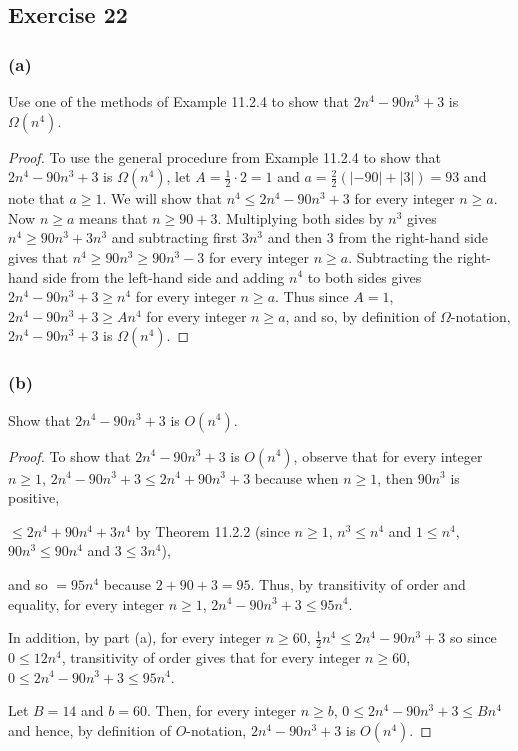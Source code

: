 \documentclass[14pt]{extarticle}
\begin{document}
\subsection{Exercise 22}
\subsubsection{(a)}
Use one of the methods of Example 11.2.4 to show that \(2n^4 - 90n^3 + 3\) is \(\Omega(n^4)\).

\begin{proof}
To use the general procedure from Example 11.2.4 to show that \(2n^4 - 90n^3 + 3\) is \(\Omega(n^4)\), let \(A = \frac{1}{2} 
\cdot 2 = 1\) and \(a = \frac{2}{2}(|-90| + |3|) = 93\) and note that \(a \geq 1\). We will show that \(n^4 \leq 2n^4 -
90n^3 + 3\) for every integer \(n \geq a\). Now \(n \geq a\) means that \(n \geq 90+3\). Multiplying both sides by \(n^3\) 
gives \(n^4 \geq 90n^3 + 3n^3\) and subtracting first \(3n^3\) and then 3 from the right-hand side gives that \(n^4 \geq 
90n^3 \geq 90n^3 - 3\) for every integer \(n \geq a\). Subtracting the right-hand side from the left-hand side and 
adding \(n^4\) to both sides gives \(2n^4 - 90n^3 + 3 \geq n^4\) for every integer \(n \geq a\). Thus since \(A = 1\), 
\(2n^4 - 90n^3 + 3 \geq An^4\) for every integer \(n \geq a\), and so, by definition of \(\Omega\)-notation, 
\(2n^4 - 90n^3 + 3\) is \(\Omega(n^4)\).
\end{proof}

\subsubsection{(b)}
Show that \(2n^4 - 90n^3 + 3\) is \(O(n^4)\).
\begin{proof}
To show that \(2n^4 - 90n^3 + 3\) is \(O(n^4)\), observe that for every integer \(n \geq 1\), 
\(2n^4 - 90n^3 + 3 \leq 2n^4 + 90n^3 + 3\) because when \(n \geq 1\), then \(90n^3\) is positive, 

\(\leq 2n^4 + 90n^4 + 3n^4\) by Theorem 11.2.2 (since \(n \geq 1\), \(n^3 \leq n^4\) and \(1 \leq n^4\), \(90n^3 \leq 90n^4\) 
and \(3 \leq 3n^4\)),

and so \(= 95n^4\) because \(2 + 90 + 3 = 95\). Thus, by transitivity of order and equality, for every integer 
\(n \geq 1\), \(2n^4 - 90n^3 + 3 \leq 95n^4\). 

In addition, by part (a), for every integer \(n \geq 60\), \(\frac{1}{2}n^4 \leq 2n^4 - 90n^3 + 3\) so since 
\(0 \leq 12 n^4\), transitivity of order gives that for every integer \(n \geq 60\), \(0 \leq 2n^4 - 90n^3 + 3 \leq 95n^4\). 

Let \(B = 14\) and \(b = 60\). Then, for every integer \(n \geq b\), \(0 \leq 2n^4 - 90n^3 + 3 \leq Bn^4\) and hence, by 
definition of \(O\)-notation, \(2n^4 - 90n^3 + 3\) is \(O(n^4)\).
\end{proof}
\end{document}
